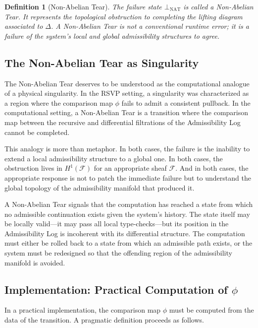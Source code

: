 \documentclass[12pt]{article}
\newtheorem{definition}{Definition}
\begin{document}
\begin{definition}[Non-Abelian Tear]
The failure state $\bot_{\mathrm{NAT}}$ is called a \emph{Non-Abelian Tear}. It
represents the topological obstruction to completing the lifting diagram associated to
$\Delta$. A Non-Abelian Tear is not a conventional runtime error; it is a failure of
the system's local and global admissibility structures to agree.
\end{definition}

\subsection{The Non-Abelian Tear as Singularity}

The Non-Abelian Tear deserves to be understood as the computational analogue of a
physical singularity. In the RSVP setting, a singularity was characterized as a region
where the comparison map $\phi$ fails to admit a consistent pullback. In the
computational setting, a Non-Abelian Tear is a transition where the comparison map
between the recursive and differential filtrations of the Admissibility Log cannot be
completed.

This analogy is more than metaphor. In both cases, the failure is the inability to
extend a local admissibility structure to a global one. In both cases, the obstruction
lives in $H^1(\mathcal{F})$ for an appropriate sheaf $\mathcal{F}$. And in both
cases, the appropriate response is not to patch the immediate failure but to understand
the global topology of the admissibility manifold that produced it.

A Non-Abelian Tear signals that the computation has reached a state from which no
admissible continuation exists given the system's history. The state itself may be
locally valid---it may pass all local type-checks---but its position in the
Admissibility Log is incoherent with its differential structure. The computation must
either be rolled back to a state from which an admissible path exists, or the system
must be redesigned so that the offending region of the admissibility manifold is
avoided.

\subsection{Implementation: Practical Computation of $\phi$}

In a practical implementation, the comparison map $\phi$ must be computed from the
data of the transition. A pragmatic definition proceeds as follows.
\end{document}
